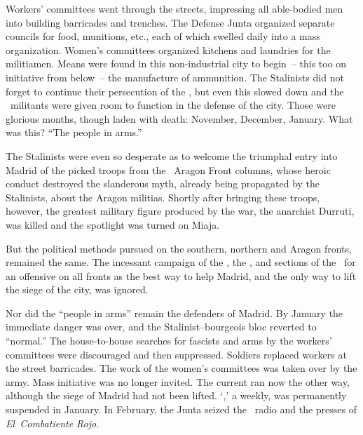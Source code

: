 Workers’ committees went through the streets, impressing all able-bodied men into building barricades and trenches. The Defense Junta organized separate councils for food, munitions, etc., each of which swelled daily into a mass organization. Women’s committees organized kitchens and laundries for the militiamen. Means were found in this non-industrial city to begin~-- this too on initiative from below~-- the manufacture of ammunition. The Stalinists did not forget to continue their persecution of the \POUM\kn, but even this slowed down and the \POUM\ militants were given room to function in the defense of the city. Those were glorious months, though laden with death: November, December, January. What was this? ``\kp The people in arms.\kn\kn''

\indexCNT{}
The Stalinists were even so desperate as to welcome the triumphal entry into Madrid of the picked troops from the \CNT\ Aragon Front columns, whose heroic conduct destroyed the slanderous myth, already being propagated by the Stalinists, about the Aragon militias. Shortly after bringing these troops, however, the greatest military figure produced by the war\kn, the anarchist Durruti, was killed and the spotlight was turned on Miaja.

But the political methods pursued on the southern, northern and Aragon fronts, remained the same. The incessant campaign of the \CNT\kn, the \POUM\kn, and sections of the \UGT\ for an offensive on all fronts as the best way to help Madrid, and the only way to lift the siege of the city, was ignored.

Nor did the ``people in arms'' remain the defenders of Madrid. By January the immediate danger was over, and the Stalinist--bourgeois bloc reverted to ``normal.\kn\kn'' The house-to-house searches for fascists and arms by the workers’ committees were discouraged and then suppressed. Soldiers replaced workers at the street barricades. The work of the women’s committees was taken over by the army. Mass initiative was no longer invited. The current ran now the other way, although the siege of Madrid had not been lifted. `\POUM,\kn\kn' a weekly\kn, was permanently suspended in January. In February\kn, the Junta seized the \POUM\ radio and the presses of \emph{El~Combatiente Rojo.}

